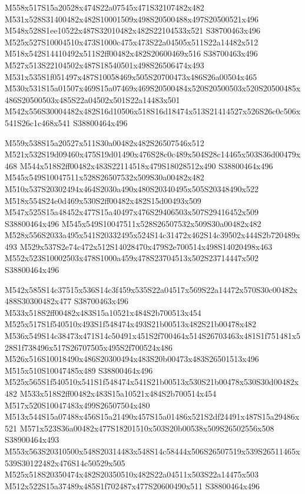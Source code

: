 \documentclass{article}
\begin{document}
\begin{multicols}{2}
M558x517S15a20528x474S22a07545x471S32107482x482 M531x528S31400482x482S10001509x498S20500488x497S20500521x496 M548x528S1ee10522x487S32010482x482S22104533x521 S38700463x496 M525x527S10004510x473S1000c475x473S22a04505x511S22a14482x512 M518x542S14410492x511S2ff00482x482S20600469x516 S38700463x496 M527x513S22104502x487S18540501x498S26506474x493 M531x535S1f051497x487S10058469x505S20700473x486S26a00504x465 M530x531S15a01507x469S15a07469x469S20500484x520S20500503x520S20500485x486S20500503x485S22a04502x501S22a14483x501 M542x556S30004482x482S16d10506x518S16d18474x513S21414527x526S26c0c506x541S26c1c468x541 S38800464x496

M559x538S15a20527x511S30a00482x482S26507546x512 M521x532S19d09460x475S19d01490x476S28c0c489x504S28c14465x503S36d00479x468 M544x518S2ff00482x483S22114518x479S18028512x490 S38800464x496 M545x549S10047511x528S26507532x509S30a00482x482 M510x537S20302494x464S2030a490x480S20340495x505S20348490x522 M518x554S24e0d469x530S2ff00482x482S15d00493x509 M547x525S15a48452x477S15a40497x476S29406503x507S29416452x509 S38800464x496 M545x549S10047511x528S26507532x509S30a00482x482 M528x556S2033a495x541S20332495x524S14c31472x462S14c39502x444S2b720489x493 M529x537S2e74c472x512S14028470x479S2e700514x498S14020498x463 M552x523S10002503x478S1000a459x478S23704513x502S23714447x502 S38800464x496

M542x585S14c37515x536S14c3f459x535S22a04517x569S22a14472x570S30c00482x488S30300482x477 S38700463x496 M533x518S2ff00482x483S15a10521x484S2b700513x454 M525x517S1f540510x493S1f548474x493S21b00513x482S21b00478x482 M536x549S14c38473x471S14c50491x451S2f700464x514S26703463x481S1f751481x528S1f738496x517S26707505x495S2f700524x486 M526x516S10018490x486S20300494x483S20b00473x483S26501513x496 M515x510S10047485x489 S38800464x496 M525x565S1f540510x541S1f548474x541S21b00513x530S21b00478x530S30d00482x482 M533x518S2ff00482x483S15a10521x484S2b700514x454 M517x520S10047483x499S26507504x480 M513x544S15a07488x456S15a21490x457S15a01486x521S2df24491x487S15a29486x521 M571x523S36a00482x477S18201510x503S20b00538x509S26502556x508 S38900464x493 M553x563S20310500x548S20314483x548S14c58444x506S26507519x539S26511465x539S30122482x476S14c50529x505 M525x518S20350474x482S20350510x482S22a04511x503S22a14475x503 M512x522S15a37489x485S1f702487x477S20600490x511 S38800464x496


\end{multicols}
\end{document}
